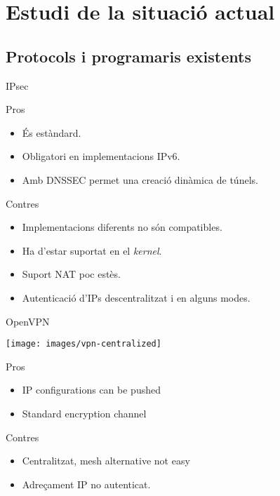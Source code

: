 \section{Estudi de la situació actual}
\subsection{Protocols i programaris existents}
    \begin{frame}{IPsec}
	\begin{exampleblock}{Pros}
		\begin{itemize}
\item És estàndard.
\item Obligatori en implementacions IPv6.
\item Amb DNSSEC permet una creació dinàmica de túnels.
		\end{itemize}
	\end{exampleblock}
	\begin{alertblock}{Contres}
		\begin{itemize}
\item Implementacions diferents \alert{no són compatibles}.
\item Ha d'estar suportat en el \emph{kernel}.
\item Suport NAT poc estès.
\item Autenticació d'IPs descentralitzat i en alguns modes.
		\end{itemize}
	\end{alertblock}
    \end{frame}
    \begin{frame}{OpenVPN}
        \begin{center}
        \texttt{[image: images/vpn-centralized]}
        \end{center}
	\begin{exampleblock}{Pros}
		\begin{itemize}
\item IP configurations can be pushed
\item Standard encryption channel
		\end{itemize}
	\end{exampleblock}
	\begin{alertblock}{Contres}
		\begin{itemize}
\item Centralitzat, mesh alternative not easy
\item Adreçament IP no autenticat.
		\end{itemize}
	\end{alertblock}
    \end{frame}
